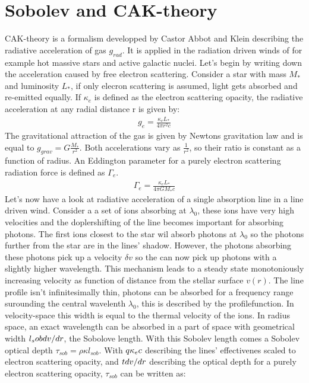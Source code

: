 \section{Sobolev and CAK-theory}
CAK-theory is a formalism developped by Castor Abbot and Klein \cite{CAK} describing the radiative acceleration of gas $g_{rad}$. It is applied in the radiation driven winds of for example hot massive stars  and active galactic nuclei. Let's begin by writing down the acceleration caused by free electron scattering. Consider a star with mass $M_*$ and luminosity $L_*$, if only elecron scattering is assumed, light gets absorbed and re-emitted equally. If $\kappa_e$ is defined as the electron scattering opacity, the radiative acceleration at any radial distance r is given by:
\begin{align}
g_e = \frac{\kappa_e L_*}{4 \pi r^2 c}
\end{align}
The gravitational attraction of the gas is given by Newtons gravitation law and is equal to $g_{grav} = G\frac{M_*}{r^2}$. Both accelerations vary as $\frac{1}{r^2}$, so their ratio is constant as a function of radius. An Eddington parameter for a purely electron scattering radiation force is defined as $\Gamma_e$.
\begin{align}
\Gamma_e = \frac{\kappa_e L_*}{4 \pi G M_* c}
\end{align}
Let's now have a look at radiative acceleration of a single absorption line in a line driven wind. Consider a a set of ions absorbing at $\lambda_0$, these ions have very high velocities and the doplershifting of the line becomes important for absorbing photons. The first ions closest to the star wil absorb photons at $\lambda_0$ so the photons further from the star are in the lines' shadow. However, the photons absorbing these photons pick up a velocity $\delta v$ so the can now pick up photons with a slightly higher wavelength. This mechanism leads to a steady state monotoniously increasing velocity as function of distance from the stellar surface $v(r)$. The line profile isn't infinitesimally thin, photons can be absorbed for a frequency range surounding the central wavelenth $\lambda_0$, this is described by the profilefunction. In velocity-space this width is equal to the thermal velocity of the ions. In radius space, an exact wavelength can be absorbed in a part of space with geometrical width $l_sob \def \frac{v_{th}}{dv/dr}$, the Sobolove length. With this Sobolev length comes a Sobolev optical depth $\tau_{sob} = \rho \kappa l_{sob}$. With $q \def \frac{\kappa v_{th}}{\kappa_e c}$ describing the lines' effectivenes scaled to electron scattering opacity, and $t \def  \frac{\rho \kappa_e c}{dv/dr}$ describing the optical depth for a purely electron scattering opacity, $\tau_{sob}$ can be written as:
